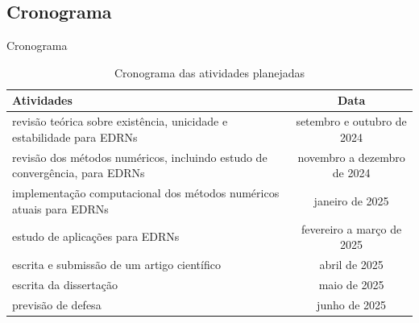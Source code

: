 \documentclass{beamer}
\theoremstyle{plain}
\theoremstyle{definition}
\begin{document}

\subsection{Cronograma}
\begin{frame}{Cronograma}
    \scriptsize
    \begin{table}[H]
        \begin{center}
            \begin{tabular}{| p{5cm}| c |}
                \hline
                \textbf{Atividades} & \textbf{Data} \\\hline

                revisão teórica sobre existência,
                unicidade e estabilidade para EDRNs
                                    & setembro e outubro de 2024			\\\hline

                                    revisão dos métodos numéricos,
                                    incluindo estudo de convergência,
                                    para EDRNs
                                    &  novembro a dezembro de 2024		\\\hline

                                    implementação computacional dos métodos
                                    numéricos atuais para EDRNs
                                    & janeiro  de 2025 \\\hline

                                    estudo de aplicações para EDRNs
                                    & fevereiro a março de 2025 \\\hline

                                    escrita e submissão de um artigo científico
                                    & abril de 2025 \\\hline

                                    escrita da dissertação
                                    & maio de 2025 \\\hline

                                    previsão de defesa
                                    & junho de 2025 \\\hline

            \end{tabular}
            \caption{Cronograma das atividades planejadas}
            \label{cronograma}
        \end{center}
    \end{table}

\end{frame}
\end{document}
